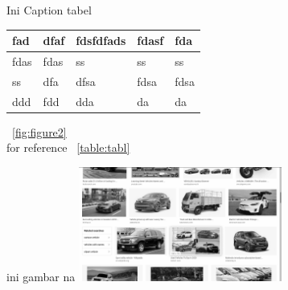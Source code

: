 \begin{atable}{Ini Caption tabel}
    \label{table:tabl}
    \begin{tabular}{|l|l|l|l|l|}
    \hline
    fad  & dfaf & fdsfdfads & fdasf & fda  \\
    \hline
    fdas & fdas & ss        & ss    & ss   \\
    \hline
    ss   & dfa  & dfsa      & fdsa  & fdsa \\
    \hline
    ddd  & fdd  & dda       & da    & da \\
    \hline
    \end{tabular}
\end{atable}

\blindtext
~\ref{fig:figure2}
\\
for reference ~\ref{table:tabl}

\begin{afigure}{ini gambar na}
    \label{fig:f1}
    \includegraphics[width=0.5\textwidth, center]{images/input.png}
\end{afigure}
